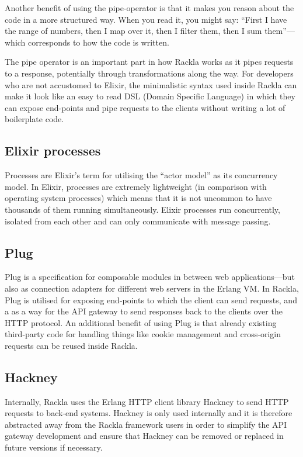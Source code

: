 \documentclass{cslthse-msc}
\begin{document}
Another benefit of using the pipe-operator is that it makes you reason about the code in a more structured way. When you read it, you might say: \enquote{First I have the range of numbers, then I map over it, then I filter them, then I sum them}---which corresponds to how the code is written.

The pipe operator is an important part in how Rackla works as it pipes requests to a response, potentially through transformations along the way. For developers who are not accustomed to Elixir, the minimalistic syntax used inside Rackla can make it look like an easy to read DSL (Domain Specific Language) in which they can expose end-points and pipe requests to the clients without writing a lot of boilerplate code.

\subsection{Elixir processes}
Processes are Elixir's term for utilising the \enquote{actor model} as its concurrency model. In Elixir, processes are extremely lightweight (in comparison with operating system processes) which means that it is not uncommon to have thousands of them running simultaneously. Elixir processes run concurrently, isolated from each other and can only communicate with message passing\cite{elixir_processes}.

\subsection{Plug}
Plug is a specification for composable modules in between web applications---but also as connection adapters for different web servers in the Erlang VM\cite{plug}. In Rackla, Plug is utilised for exposing end-points to which the client can send requests, and a as a way for the API gateway to send responses back to the clients over the HTTP protocol. An additional benefit of using Plug is that already existing third-party code for handling things like cookie management and cross-origin requests can be reused inside Rackla.

\subsection{Hackney}
Internally, Rackla uses the Erlang HTTP client library Hackney\cite{hackney} to send HTTP requests to back-end systems. Hackney is only used internally and it is therefore abstracted away from the Rackla framework users in order to simplify the API gateway development and ensure that Hackney can be removed or replaced in future versions if necessary.
\end{document}
